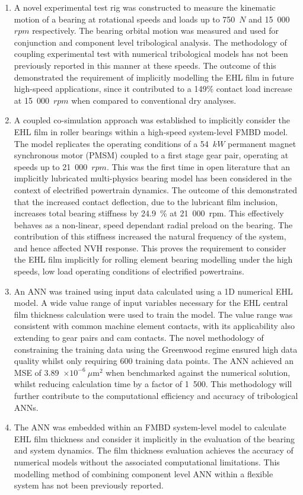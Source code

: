 \begin{enumerate}
	\item A novel experimental test rig was constructed to measure the kinematic motion of a bearing at rotational speeds and loads up to 750~$N$ and 15~000~$rpm$ respectively. The bearing orbital motion was measured and used for conjunction and component level tribological analysis. The methodology of coupling experimental test with numerical tribological models has not been previously reported in this manner at these speeds. The outcome of this demonstrated the requirement of implicitly modelling the EHL film in future high-speed applications, since it contributed to a 149\% contact load increase at 15~000~$rpm$ when compared to conventional dry analyses.
	
	\item A coupled co-simulation approach was established to implicitly consider the EHL film in roller bearings within a high-speed system-level FMBD model. The model replicates the operating conditions of a 54~$kW$ permanent magnet synchronous motor (PMSM) coupled to a first stage gear pair, operating at speeds up to 21~000~$rpm$. This was the first time in open literature that an implicitly lubricated multi-physics bearing model has been considered in the context of electrified powertrain dynamics. The outcome of this demonstrated that the increased contact deflection, due to the lubricant film inclusion, increases total bearing stiffness by 24.9~\% at 21~000~rpm. This effectively behaves as a non-linear, speed dependant radial preload on the bearing. The contribution of this stiffness increased the natural frequency of the system, and hence affected NVH response. This proves the requirement to consider the EHL film implicitly for rolling element bearing modelling under the high speeds, low load operating conditions of electrified powertrains.
	
	\item An ANN was trained using input data calculated using a 1D numerical EHL model. A wide value range of input variables necessary for the EHL central film thickness calculation were used to train the model. The value range was consistent with common machine element contacts, with its applicability also extending to gear pairs and cam contacts. The novel methodology of constraining the training data using the Greenwood regime ensured high data quality whilst only requiring 600 training data points. The ANN achieved an MSE of 3.89~$\times 10^{-6}~\mu \mathrm{m}^2$ when benchmarked against the numerical solution, whilst reducing calculation time by a factor of 1~500. This methodology will further contribute to the computational efficiency and accuracy of tribological ANNs.
	
	\item The ANN was embedded within an FMBD system-level model to calculate EHL film thickness and consider it implicitly in the evaluation of the bearing and system dynamics. The film thickness evaluation achieves the accuracy of numerical models without the associated computational limitations. This modelling method of combining component level ANN within a flexible system has not been previously reported.
\end{enumerate}

